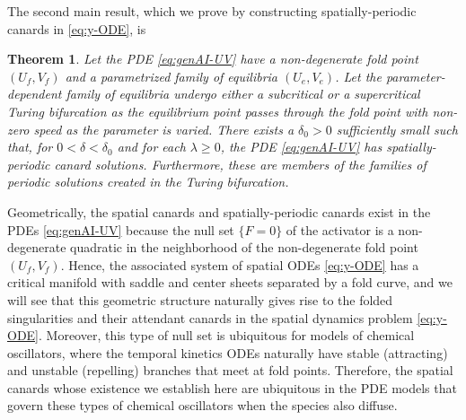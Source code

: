 \documentclass[11pt]{article}
\numberwithin{equation}{section}
\newtheorem{theorem}{Theorem}[section]
\begin{document}
The second main result, 
which we prove by constructing spatially-periodic canards in \eqref{eq:y-ODE}, is
\begin{theorem}\label{thm:2}
Let the PDE \eqref{eq:genAI-UV} have a non-degenerate fold point $(U_f,V_f)$ 
and a parametrized family of equilibria $(U_e,V_e)$.
Let the parameter-dependent family of equilibria undergo either a subcritical or a supercritical Turing bifurcation as the equilibrium point passes through the fold point with non-zero speed as the parameter is varied. 
There exists a $\delta_0>0$ sufficiently small such that, for $0<\delta<\delta_0$ and for each $\lambda\ge 0$, the PDE \eqref{eq:genAI-UV} has spatially-periodic canard solutions.
Furthermore, these are members of the families of periodic solutions created in the Turing bifurcation.     
\end{theorem}


Geometrically, the spatial canards and spatially-periodic canards exist in the PDEs \eqref{eq:genAI-UV} because the null set $\{ F=0 \}$ of the activator is a non-degenerate quadratic in the neighborhood of the non-degenerate fold point $(U_f,V_f)$.
Hence, the associated system of spatial ODEs \eqref{eq:y-ODE} has a critical manifold with saddle and center sheets separated by a fold curve, and we will see that this geometric structure naturally gives rise to the folded singularities and their attendant canards in the spatial dynamics problem \eqref{eq:y-ODE}.
Moreover, this type of null set is ubiquitous for models of chemical oscillators, where the temporal kinetics ODEs naturally have stable (attracting) and unstable (repelling) branches that meet at fold points.
Therefore, the spatial canards whose existence we establish here are ubiquitous in the PDE models that govern these types of chemical oscillators when the species also diffuse.
\end{document}
